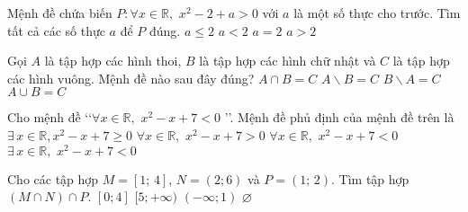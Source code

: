 \begin{ex}%
Mệnh đề chứa biến  $P:\forall x \in \mathbb{R},\,\,{x^2} - 2 + a > 0$ với $ a $ là một số thực cho trước. Tìm tất cả các số thực $ a $  để  $ P $ đúng.
\choice
{ $a \le 2$ }
{$a < 2$  }
{ $a = 2$ }
{\True $a > 2$ }
\end{ex}

\begin{ex} %
Gọi ${A}$ là tập hợp các hình thoi, ${B}$ là tập hợp các hình chữ nhật và ${C}$ là tập hợp các hình vuông. Mệnh đề nào sau đây đúng?
\choice
{ \True $A\cap B=C $}
{ $A\backslash B=C$}
{ $B\backslash A=C$}
{ ${A\cup B=C}$
}
\end{ex}

\begin{ex}%
Cho mệnh đề \lq\lq$\forall x \in \mathbb{R} ,\,\,{x^2} - x + 7 < 0$ \rq\rq. Mệnh đề phủ định của mệnh đề trên là
\choice
{\True $\exists \,x \in \mathbb{R}, {x^2} - x + 7 \ge 0$ }
{ $\forall x \in \mathbb{R},\,\,{x^2} - x + 7 > 0$ }
{ $\forall x \in \mathbb{R},\,\,{x^2} - x + 7 < 0$ }
{ $\exists \,x \in \mathbb{R} ,\,\,{x^2} - x + 7 < 0$ }
\end{ex}

\begin{ex} %
Cho các tập hợp $M=[ 1;\,4 ]$, $N = (2; 6)$ và $P=( 1;\,2 )$. Tìm tập hợp $(M \cap N) \cap P$.
\choice
{ $[0; 4]$}
{ $[5; + \infty )$}
{ $(- \infty; 1)$}
{ \True $\varnothing $}
\loigiai{
Ta có $M\cap N=(2;4]\Rightarrow M\cap N\cap P=(2;4]\cap (1;2)=\varnothing.$}
\end{ex}

